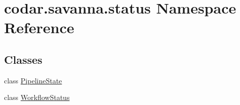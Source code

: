 \hypertarget{namespacecodar_1_1savanna_1_1status}{}\section{codar.\+savanna.\+status Namespace Reference}
\label{namespacecodar_1_1savanna_1_1status}
\subsection*{Classes}
\begin{DoxyCompactItemize}
\item 
class \hyperlink{classcodar_1_1savanna_1_1status_1_1_pipeline_state}{Pipeline\+State}
\item 
class \hyperlink{classcodar_1_1savanna_1_1status_1_1_workflow_status}{Workflow\+Status}
\end{DoxyCompactItemize}
